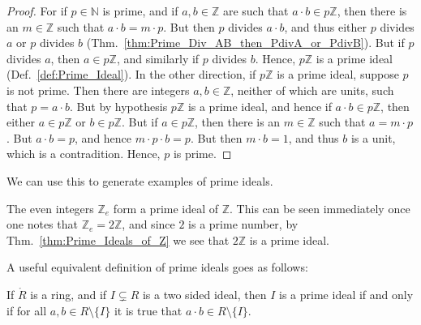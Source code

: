 \documentclass{article}                                                        %
\begin{document}
        \begin{proof}
            For if $p\in\mathbb{N}$ is prime, and if $a,b\in\mathbb{Z}$ are such
            that $a\cdot{b}\in{p}\mathbb{Z}$, then there is an $m\in\mathbb{Z}$
            such that $a\cdot{b}=m\cdot{p}$. But then $p$ divides $a\cdot{b}$,
            and thus either $p$ divides $a$ or $p$ divides $b$
            (Thm.~\ref{thm:Prime_Div_AB_then_PdivA_or_PdivB}). But if $p$
            divides $a$, then $a\in{p}\mathbb{Z}$, and similarly if $p$ divides
            $b$. Hence, $p\mathbb{Z}$ is a prime ideal
            (Def.~\ref{def:Prime_Ideal}). In the other direction, if
            $p\mathbb{Z}$ is a prime ideal, suppose $p$ is not prime. Then there
            are integers $a,b\in\mathbb{Z}$, neither of which are units, such
            that $p=a\cdot{b}$. But by hypothesis $p\mathbb{Z}$ is a prime
            ideal, and hence if $a\cdot{b}\in{p}\mathbb{Z}$, then either
            $a\in{p}\mathbb{Z}$ or $b\in{p}\mathbb{Z}$. But if
            $a\in{p}\mathbb{Z}$, then there is an $m\in\mathbb{Z}$ such that
            $a=m\cdot{p}$. But $a\cdot{b}=p$, and hence $m\cdot{p}\cdot{b}=p$.
            But then $m\cdot{b}=1$, and thus $b$ is a unit, which is a
            contradition. Hence, $p$ is prime.
        \end{proof}
        We can use this to generate examples of prime ideals.
        \begin{example}
            The even integers $\mathbb{Z}_{e}$ form a prime ideal of
            $\mathbb{Z}$. This can be seen immediately once one notes that
            $\mathbb{Z}_{e}=2\mathbb{Z}$, and since $2$ is a prime number,
            by Thm.~\ref{thm:Prime_Ideals_of_Z} we see that $2\mathbb{Z}$ is a
            prime ideal.
        \end{example}
        A useful equivalent definition of prime ideals goes as follows:
        \begin{theorem}
            If $\ring{R}$ is a ring, and if $I\subsetneq{R}$ is a two sided
            ideal, then $I$ is a prime ideal if and only if for all
            $a,b\in{R}\setminus\{I\}$ it is true that
            $a\cdot{b}\in{R}\setminus\{I\}$.
        \end{theorem}
\end{document}
